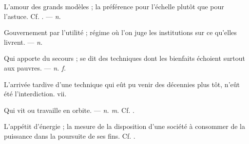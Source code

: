  L'amour des grands modèles ; la préférence pour l'échelle plutôt que pour l'astuce. Cf. . ---  \textit{n.}

 Gouvernement par l'utilité ; régime où l'on juge les institutions sur ce qu'elles livrent. ---  \textit{n.}

 Qui apporte du secours ; se dit des techniques dont les bienfaits échoient surtout aux pauvres. ---  \textit{n. f.}

 L'arrivée tardive d'une technique qui eût pu venir des décennies plus tôt, n'eût été l'interdiction.   vii.

 Qui vit ou travaille en orbite. ---  \textit{n. m.} Cf. .

 L'appétit d'énergie ; la mesure de la disposition d'une société à consommer de la puissance dans la poursuite de ses fins. Cf. .
